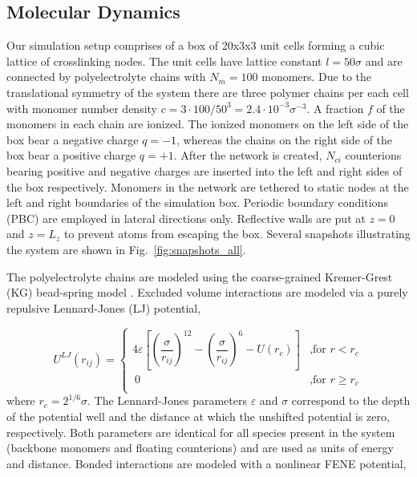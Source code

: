 \documentclass[twoside,twocolumn,9pt]{article}
\begin{document}
\subsection{Molecular Dynamics}
Our simulation setup comprises of a box of 20x3x3 unit cells forming a cubic lattice of crosslinking nodes. The unit cells have lattice constant $l = 50\sigma$ and are connected by polyelectrolyte chains with $N_m = 100$ monomers. Due to the translational symmetry of the system there are three polymer chains per each cell with monomer number density $c = 3 \cdot 100 / 50^3 = 2.4 \cdot 10^{-3}\sigma^{-3}$. A fraction $f$ of the monomers in each chain are ionized. The ionized monomers on the left side of the box bear a negative charge $q= -1$, whereas the chains on the right side of the box bear a positive charge $q= +1$.  After the network is created, $N_{ci}$ counterions bearing positive and negative charges are inserted into the left and right sides of the box respectively. Monomers in the network are tethered to static nodes at the left and right boundaries of the simulation box. Periodic boundary conditions (PBC) are employed in lateral directions only. Reflective walls are put at $z=0$ and $z=L_z$ to prevent atoms from escaping the box. Several snapshots illustrating the system are shown in Fig.~\ref{fig:snapshots_all}.

The polyelectrolyte chains are modeled using the coarse-grained Kremer-Grest (KG) bead-spring model \cite{Kremer_1990}. Excluded volume interactions are modeled via a purely repulsive Lennard-Jones (LJ) potential, 

\begin{equation}\label{eq:lj_explain}
  U^{LJ}(r_{ij}) =
  \begin{cases}
    4 \varepsilon\left[\left( \dfrac{\sigma}{r_{ij}}\right)^{12} - \left(\dfrac{\sigma}{r_{ij}}\right)^{6}- U(r_c) \right] & \text{,for $r<r_c$} \\
    \ 0 & \text{,for $r \geq r_c$} \\
  \end{cases}
\end{equation}
where $r_c = 2^{1/6}\sigma$. The Lennard-Jones parameters $\varepsilon$ and $\sigma$ correspond to the depth of the potential well and the distance at which the unshifted potential is zero, respectively. Both parameters are identical for all species present in the system (backbone monomers and floating counterions) and are used as units of energy and distance. Bonded interactions are modeled with a nonlinear FENE potential,
\end{document}
